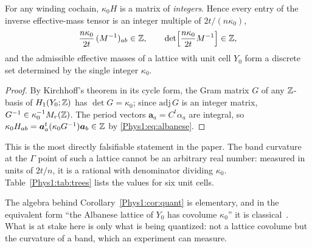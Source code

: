 \begin{corollary}\label{Phys1:cor:quant}
For any winding cochain, $\kappa_0H$ is a matrix of \emph{integers}. Hence every entry of
the inverse effective-mass tensor is an integer multiple of $2t/(n\kappa_0)$,
\begin{equation}\label{Phys1:eq:quant}
\frac{n\kappa_0}{2t}\,(M^{-1})_{ab}\in\mathbb{Z} ,
\qquad
\det\Bigl[\frac{n\kappa_0}{2t}M^{-1}\Bigr]\in\mathbb{Z} ,
\end{equation}
and the admissible effective masses of a lattice with unit cell $Y_0$ form a discrete set
determined by the single integer $\kappa_0$.
\end{corollary}

\begin{proof}
By Kirchhoff's theorem in its cycle form, the Gram matrix $G$ of any $\mathbb{Z}$-basis of
$H_1(Y_0;\mathbb{Z})$ has $\det G=\kappa_0$; since $\mathrm{adj}\,G$ is an integer matrix,
$G^{-1}\in\kappa_0^{-1}M_r(\mathbb{Z})$. The period vectors $\bm a_a=C^{t}\alpha_a$ are integral, so
$\kappa_0H_{ab}=\bm a_a^{t}(\kappa_0G^{-1})\bm a_b\in\mathbb{Z}$ by \eqref{Phys1:eq:albanese}.
\end{proof}

This is the most directly falsifiable statement in the paper. The band curvature at the
$\Gamma$ point of such a lattice cannot be an arbitrary real number: measured in units of
$2t/n$, it is a rational with denominator dividing $\kappa_0$. Table~\ref{Phys1:tab:trees}
lists the values for six unit cells.

The algebra behind Corollary~\ref{Phys1:cor:quant} is elementary, and in the equivalent form
``the Albanese lattice of $Y_0$ has covolume $\kappa_0$'' it is classical~\cite{KS3,BF}.
What is at stake here is only what is being quantized: not a lattice covolume but the
curvature of a band, which an experiment can measure.

